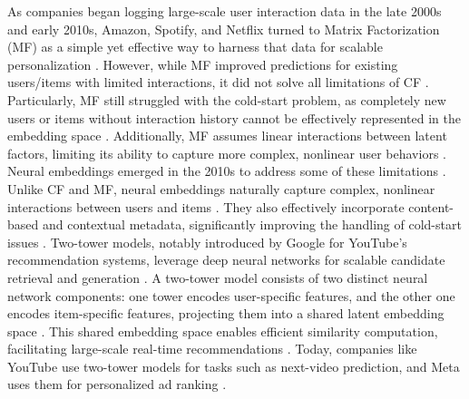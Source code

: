 \documentclass[final]{anthology-ch}         %
\begin{document}
As companies began logging large-scale user interaction data in the late 2000s and early 2010s, Amazon, Spotify, and Netflix turned to Matrix Factorization (MF) as a simple yet effective way to harness that data for scalable personalization \cite{gomez2015netflix, linden2003amazon}. However, while MF improved predictions for existing users/items with limited interactions, it did not solve all limitations of CF \cite{koren2009matrix}. Particularly, MF still struggled with the cold-start problem, as completely new users or items without interaction history cannot be effectively represented in the embedding space \cite{koren2009matrix}. Additionally, MF assumes linear interactions between latent factors, limiting its ability to capture more complex, nonlinear user behaviors \cite{he2017neural}. Neural embeddings emerged in the 2010s to address some of these limitations \cite{he2017neural}. Unlike CF and MF, neural embeddings naturally capture complex, nonlinear interactions between users and items \cite{he2017neural}. They also effectively incorporate content-based and contextual metadata, significantly improving the handling of cold-start issues \cite{van2013deep, cheng2016wide, naumov2019deep}. Two-tower models,  notably introduced by Google for YouTube’s recommendation systems, leverage deep neural networks for scalable candidate retrieval and generation \cite{covington2016deep}.  A two-tower model consists of two distinct neural network components: one tower encodes user-specific features, and the other one encodes item-specific features, projecting them into a shared latent embedding space \cite{covington2016deep}. This shared embedding space enables efficient similarity computation, facilitating large-scale real-time recommendations \cite{covington2016deep}. Today, companies like YouTube use two-tower models for tasks such as next-video prediction, and Meta uses them for personalized ad ranking \cite{covington2016deep, he2014practical, naumov2019deep}.
\end{document}
